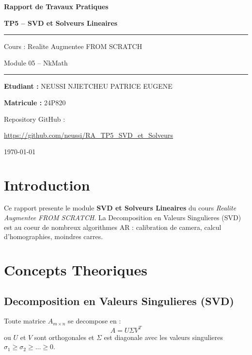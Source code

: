 \documentclass[12pt,a4paper]{article}
\begin{document}
\begin{titlepage}
    \centering
    \vspace*{2cm}
    {\huge\bfseries Rapport de Travaux Pratiques\par}
    \vspace{1cm}
    {\LARGE\bfseries\color{codeblue} TP5 -- SVD et Solveurs Lineaires\par}
    \vspace{1.5cm}
    \rule{\linewidth}{0.5pt}\vspace{0.5cm}
    {\large Cours : Realite Augmentee FROM SCRATCH\par}
    {\large Module 05 -- NkMath\par}
    \vspace{0.5cm}\rule{\linewidth}{0.5pt}
    \vspace{2cm}
    {\large\textbf{Etudiant :} NEUSSI NJIETCHEU PATRICE EUGENE\par}
    {\large\textbf{Matricule :} 24P820\par}
    \vspace{2cm}
    {\large Repository GitHub :\par}
    \href{https://github.com/neussi/RA_TP5_SVD_et_Solveurs}{https://github.com/neussi/RA\_TP5\_SVD\_et\_Solveurs}
    \vfill
    {\large \today\par}
\end{titlepage}

\tableofcontents
\newpage

\section{Introduction}

Ce rapport presente le module \textbf{SVD et Solveurs Lineaires} du cours
\textit{Realite Augmentee FROM SCRATCH}. La Decomposition en Valeurs Singulieres (SVD)
est au coeur de nombreux algorithmes AR : calibration de camera, calcul d'homographies,
moindres carres.

\section{Concepts Theoriques}

\subsection{Decomposition en Valeurs Singulieres (SVD)}

Toute matrice $A_{m\times n}$ se decompose en :
\[
    A = U \Sigma V^T
\]
ou $U$ et $V$ sont orthogonales et $\Sigma$ est diagonale avec les valeurs singulieres
$\sigma_1 \geq \sigma_2 \geq \ldots \geq 0$.
\end{document}
